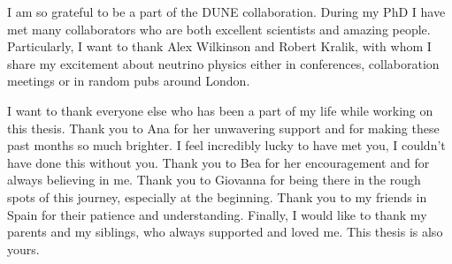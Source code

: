 I am so grateful to be a part of the DUNE collaboration. During my PhD I have met many collaborators who are both excellent scientists and amazing people. Particularly, I want to thank Alex Wilkinson and Robert Kralik, with whom I share my excitement about neutrino physics either in conferences, collaboration meetings or in random pubs around London.

I want to thank everyone else who has been a part of my life while working on this thesis. Thank you to Ana for her unwavering support and for making these past months so much brighter. I feel incredibly lucky to have met you, I couldn't have done this without you. Thank you to Bea for her encouragement and for always believing in me. Thank you to Giovanna for being there in the rough spots of this journey, especially at the beginning. Thank you to my friends in Spain for their patience and understanding. Finally, I would like to thank my parents and my siblings, who always supported and loved me. This thesis is also yours.